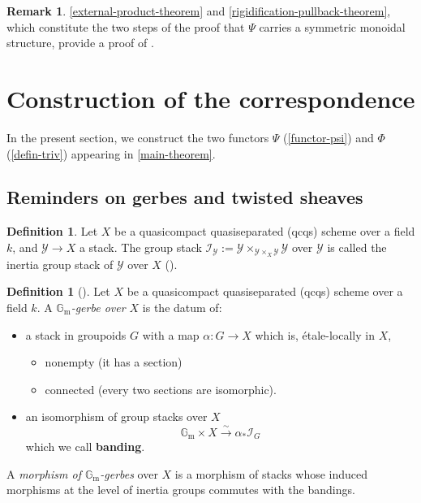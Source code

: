 \documentclass[11pt, twoside]{article} %
\numberwithin{equation}{section}
\theoremstyle{plain}
\theoremstyle{definition}
\newtheorem{defin}[thm]{Definition}
\newtheorem{rem}[thm]{Remark}
\newcommand{\Gm}{\mathbb G_{\mathrm{m}}}
\newcommand{\cI}{\mathcal I}
\newcommand{\cY}{\mathcal Y}
\begin{document}
 \begin{rem}
     \cref{external-product-theorem} and \cref{rigidification-pullback-theorem}, which constitute the two steps of the proof that $\Psi$ carries a symmetric monoidal structure, provide a proof of \cite[Conjecture 5.27]{BP}.
 \end{rem}

 \section{Construction of the correspondence}\label{Construction-section}

 In the present section, we construct the two functors $\Psi$ (\cref{functor-psi}) and $\Phi$ (\cref{defin-triv}) appearing in \cref{main-theorem}.
 
	\subsection{Reminders on gerbes and twisted sheaves}\label{section-gerbes}
 \begin{defin}Let $X$ be a quasicompact quasiseparated (qcqs) scheme over a field $k$, and $\cY\to X$ a stack. The group stack $\cI_{\cY}:= \cY \times_{\cY \times_X \cY} \cY$ over $\cY$  is called the inertia group stack of $\cY$ over $X$ (\cite[Definition 8.1.17]{Olsson}).\end{defin}
	\begin{defin}[{\cite[Definition 12.2.2 with $\boldsymbol{\mu}=\Gm\times X$]{Olsson}}]
	    Let $X$ be a quasicompact quasiseparated (qcqs) scheme over a field $k$. A \textit{$\Gm$-gerbe over $X$} is the datum of: \begin{itemize}\item a stack in groupoids $G$ with a map $\alpha:G\to X$ which is, \'etale-locally in $X$,
     \begin{itemize}\item nonempty (it has a section)
     \item connected (every two sections are isomorphic).
     \end{itemize}
     \item an isomorphism of group stacks over $X$ $$\Gm\times X\xrightarrow{\sim}\alpha_*\cI_G$$ which we call \textbf{banding}.
     \end{itemize}
     A \textit{morphism of $\Gm$-gerbes} over $X$ is a morphism of stacks whose induced morphisms at the level of inertia groups commutes with the bandings.
     \end{defin}
\end{document}

